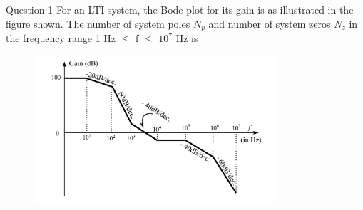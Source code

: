\documentclass[journal,12pt,twocolumn]{IEEEtran}
\begin{document}
%

\begin{abstract}
Gate Control System Question and Solution 
\end{abstract}
\begin{frame}{Question-1}
\textsf{ For an LTI system, the Bode plot for its gain is as illustrated in the figure shown. The number of system poles $N_{p}$ and number of system zeros $N_{z}$ in the frequency range 1 Hz $\leq$ f $\leq$ $10^{7}$ Hz is}

\begin{figure}[htp]
    \centering
    \includegraphics[width=9cm]{./figs/figure.png}
    
    \label{fig:galaxy}
\end{figure}
\end{frame}
\end{document}
